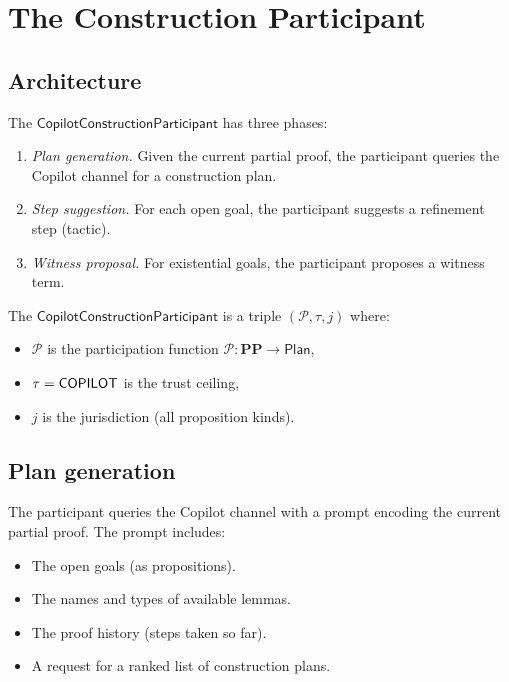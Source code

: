 \documentclass[11pt]{article}
\newcommand{\CCP}{\mathsf{CopilotConstructionParticipant}}
\begin{document}
\section{The Construction Participant}\label{sec:participant}

\subsection{Architecture}

The $\CCP$ has three phases:
\begin{enumerate}
\item \emph{Plan generation.}  Given the current partial proof,
      the participant queries the Copilot channel for a
      construction plan.
\item \emph{Step suggestion.}  For each open goal, the
      participant suggests a refinement step (tactic).
\item \emph{Witness proposal.}  For existential goals, the
      participant proposes a witness term.
\end{enumerate}

\begin{definition}\label{def:ccp}
The $\CCP$ is a triple $(\mathcal{P}, \tau, j)$ where:
\begin{itemize}
\item $\mathcal{P}$ is the participation function
      $\mathcal{P} \colon \mathbf{PP} \to \mathsf{Plan}$,
\item $\tau = \mathsf{COPILOT}$ is the trust ceiling,
\item $j$ is the jurisdiction (all proposition kinds).
\end{itemize}
\end{definition}

\subsection{Plan generation}

The participant queries the Copilot channel with a prompt
encoding the current partial proof.  The prompt includes:
\begin{itemize}
\item The open goals (as propositions).
\item The names and types of available lemmas.
\item The proof history (steps taken so far).
\item A request for a ranked list of construction plans.
\end{itemize}
\end{document}
